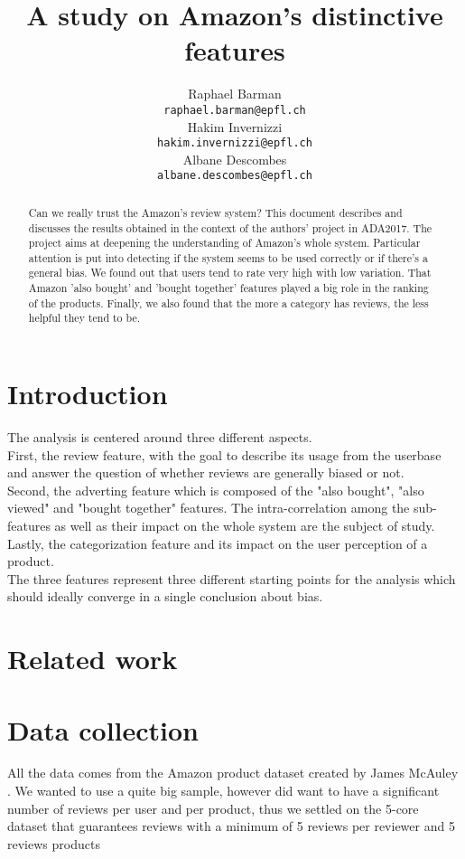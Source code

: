 \documentclass[11pt]{article}
\title{A study on Amazon's distinctive features}
\author{Raphael Barman \\
  {\tt raphael.barman@epfl.ch} \\\And
  Hakim Invernizzi \\
  {\tt hakim.invernizzi@epfl.ch} \\\And
Albane Descombes \\
{\tt albane.descombes@epfl.ch} \\}
\date{}
\begin{document}
\maketitle
\begin{abstract}
 Can we really trust the Amazon's review system? This document describes and discusses the results obtained in the context of the authors' project in ADA2017. The project aims at deepening the understanding 
  of Amazon's whole system. Particular attention is put into detecting if the system seems to be used correctly or if there's a general bias. We found out that users tend to rate very high with low variation. That Amazon 'also bought' and 'bought together' features played a big role in the ranking of the products. Finally, we also found that the more a category has reviews, the less helpful they tend to be.
\end{abstract}


\section{Introduction}
  The analysis is centered around three different aspects. \\ First, the review feature, with the goal to describe its usage from the userbase and answer the question of whether reviews are generally biased or not. \\ Second, the adverting feature which is composed of the "also bought", "also viewed" and "bought together" features. The intra-correlation among the sub-features as well as their impact on the whole system are the subject of study. \\ Lastly, the categorization feature and its impact on the user perception of a product. \\  The three features represent three different starting points for the analysis which should ideally converge in a single conclusion about bias.
\section{Related work}
\section{Data collection}
All the data comes from the Amazon product dataset created by James McAuley \cite{mcauley2015image}. We wanted to use a quite big sample, however did want to have a significant number of reviews per user and per product, thus we settled on the 5-core dataset that guarantees reviews with a minimum of 5 reviews per reviewer and 5 reviews products
\end{document}
